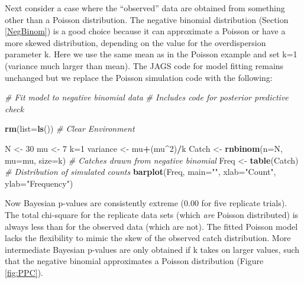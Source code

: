 \documentclass[
]{krantz}
\makeatletter
\newenvironment{Shaded}{\begin{snugshade}}{\end{snugshade}}
\newcommand{\AttributeTok}[1]{\textcolor[rgb]{0.27,0.27,0.27}{#1}}
\newcommand{\CommentTok}[1]{\textcolor[rgb]{0.37,0.37,0.37}{\textit{#1}}}
\newcommand{\DecValTok}[1]{\textcolor[rgb]{0.06,0.06,0.06}{#1}}
\newcommand{\FunctionTok}[1]{\textcolor[rgb]{0.27,0.27,0.27}{\textbf{#1}}}
\newcommand{\NormalTok}[1]{#1}
\newcommand{\OtherTok}[1]{\textcolor[rgb]{0.37,0.37,0.37}{#1}}
\newcommand{\SpecialCharTok}[1]{\textcolor[rgb]{0.43,0.43,0.43}{\textbf{#1}}}
\newcommand{\StringTok}[1]{\textcolor[rgb]{0.5,0.5,0.5}{#1}}
\newenvironment{kframe}{%
\medskip{}
\setlength{\fboxsep}{.8em}
 \def\at@end@of@kframe{}%
 \ifinner\ifhmode%
  \def\at@end@of@kframe{\end{minipage}}%
  \begin{minipage}{\columnwidth}%
 \fi\fi%
 \def\FrameCommand##1{\hskip\@totalleftmargin \hskip-\fboxsep
 \colorbox{shadecolor}{##1}\hskip-\fboxsep
     \hskip-\linewidth \hskip-\@totalleftmargin \hskip\columnwidth}%
 \MakeFramed {\advance\hsize-\width
   \@totalleftmargin\z@ \linewidth\hsize
   \@setminipage}}%
 {\par\unskip\endMakeFramed%
 \at@end@of@kframe}
\renewenvironment{Shaded}{\begin{kframe}}{\end{kframe}}
\makeatother
\begin{document}
Next consider a case where the ``observed'' data are obtained from something other than a Poisson distribution. The negative binomial distribution (Section \ref{NegBinom}) is a good choice because it can approximate a Poisson or have a more skewed distribution, depending on the value for the overdispersion parameter k. Here we use the same mean as in the Poisson example and set k=1 (variance much larger than mean). The JAGS code for model fitting remains unchanged but we replace the Poisson simulation code with the following:

\begin{Shaded}
\begin{Highlighting}[]
\CommentTok{\# Fit model to negative binomial data}
\CommentTok{\# Includes code for posterior predictive check}

\FunctionTok{rm}\NormalTok{(}\AttributeTok{list=}\FunctionTok{ls}\NormalTok{()) }\CommentTok{\# Clear Environment}

\NormalTok{N }\OtherTok{\textless{}{-}} \DecValTok{30}
\NormalTok{mu }\OtherTok{\textless{}{-}} \DecValTok{7}
\NormalTok{k}\OtherTok{=}\DecValTok{1}
\NormalTok{variance }\OtherTok{\textless{}{-}}\NormalTok{ mu}\SpecialCharTok{+}\NormalTok{(mu}\SpecialCharTok{\^{}}\DecValTok{2}\NormalTok{)}\SpecialCharTok{/}\NormalTok{k}
\NormalTok{Catch }\OtherTok{\textless{}{-}} \FunctionTok{rnbinom}\NormalTok{(}\AttributeTok{n=}\NormalTok{N, }\AttributeTok{mu=}\NormalTok{mu, }\AttributeTok{size=}\NormalTok{k) }\CommentTok{\# Catches drawn from negative binomial}
\NormalTok{Freq }\OtherTok{\textless{}{-}} \FunctionTok{table}\NormalTok{(Catch)  }\CommentTok{\# Distribution of simulated counts}
\FunctionTok{barplot}\NormalTok{(Freq, }\AttributeTok{main=}\StringTok{""}\NormalTok{, }\AttributeTok{xlab=}\StringTok{"Count"}\NormalTok{, }\AttributeTok{ylab=}\StringTok{"Frequency"}\NormalTok{)}
\end{Highlighting}
\end{Shaded}

Now Bayesian p-values are consistently extreme (0.00 for five replicate trials). The total chi-square for the replicate data sets (which \emph{are} Poisson distributed) is always less than for the observed data (which are not). The fitted Poisson model lacks the flexibility to mimic the skew of the observed catch distribution. More intermediate Bayesian p-values are only obtained if k takes on larger values, such that the negative binomial approximates a Poisson distribution (Figure \ref{fig:PPC}).
\end{document}
